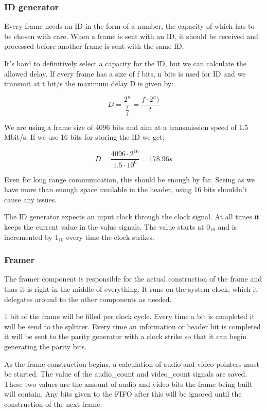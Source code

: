 \subsubsection{ID generator}
Every frame needs an ID in the form of a number, the capacity of which has to be chosen with care. When a frame is sent with an ID, it should be received and processed before another frame is sent with the same ID.

It’s hard to definitively select a capacity for the ID, but we can calculate the allowed delay. If every frame has a size of f bits, n bits is used for ID and we transmit at t bit/s the maximum delay D is given by:

\begin{equation}
  D = \frac{2^n}{\frac{t}{f}} = \frac{f \cdot 2^n)}{t}
\end{equation}

We are using a frame size of 4096 bits and aim at a transmission speed of 1.5 Mbit/s. If we use 16 bits for storing the ID we get:

\begin{equation}
  D = \frac{4096 \cdot 2^{16}}{1.5 \cdot 10^6} = 178.96 s
\end{equation}

Even for long range communication, this should be enough by far. Seeing as we have more than enough space available in the header, using 16 bits shouldn’t cause any issues.

The ID generator expects an input clock through the clock signal. At all times it keeps the current value in the value signals. The value starts at $0_{10}$ and is incremented by $1_{10}$ every time the clock strikes.

\subsubsection{Framer}
The framer component is responsible for the actual construction of the frame and thus it is right in the middle of everything. It runs on the system clock, which it delegates around to the other components as needed.

1 bit of the frame will be filled per clock cycle. Every time a bit is completed it will be send to the splitter. Every time an information or header bit is completed it will be sent to the parity generator with a clock strike so that it can begin generating the parity bits.

As the frame construction begins, a calculation of audio and video pointers must be started. The value of the audio\_count and video\_count signals are saved. These two values are the amount of audio and video bits the frame being built will contain. Any bits given to the FIFO after this will be ignored until the construction of the next frame.

